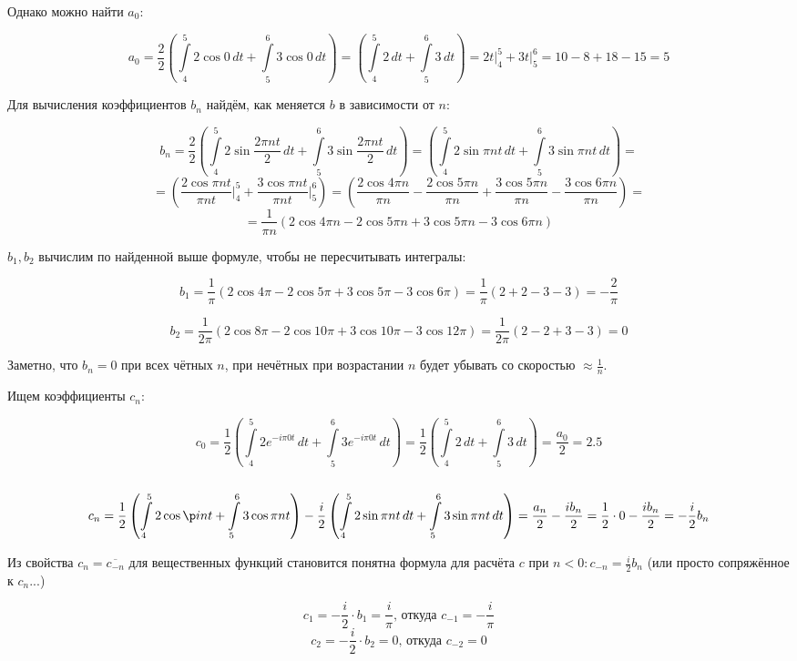 \documentclass[a4paper]{article}
\newcommand{\at}{\biggr\rvert}
\let\oldint\int
\def\int{\oldint\limits}
\begin{document}
Однако можно найти $a_0$:

$$
a_0 = \frac{2}{2}\left( \int_{4}^{5} 2 \cos{0}\,dt + \int_{5}^{6} 3\cos{0}\,dt \right) = \left(\int_{4}^{5} 2\,dt + \int_{5}^{6} 3\,dt\right) = 2t\at^5_4 + 3t\at^6_5 = 10 - 8 + 18 - 15 = 5
$$

Для вычисления коэффициентов $b_n$ найдём, как меняется $b$ в зависимости от $n$:

$$b_n = \frac{2}{2}\left( \int_{4}^{5} 2\sin\frac{2\pi n t}{2}\,dt + \int_{5}^{6} 3\sin\frac{2\pi n t}{2}\,dt\right) = \left( \int_{4}^{5} 2\sin{\pi nt}\,dt + \int_{5}^{6} 3\sin{\pi nt}\,dt\right) = $$
$$= \left( \frac{2\cos{\pi nt}}{\pi nt} \at^5_4 + \frac{3\cos{\pi nt}}{\pi nt}\at^6_5 \right) = \left( \frac{2\cos{4\pi n}}{\pi n} - \frac{2\cos{5\pi n}}{\pi n} + \frac{3\cos{5\pi n}}{\pi n} - \frac{3\cos{6\pi n}}{\pi n}\right)=$$
$$=\frac{1}{\pi n} \left( 2\cos{4\pi n} - 2\cos{5\pi n} + 3\cos{5\pi n} - 3\cos{6\pi n}\right)
$$

$b_1, b_2$ вычислим по найденной выше формуле, чтобы не пересчитывать интегралы:

$$
b_1 = \frac{1}{\pi} \left( 2\cos{4\pi} - 2\cos{5\pi} + 3\cos{5\pi} - 3\cos{6\pi}\right)=\frac{1}{\pi}\left( 2 + 2 - 3 -3 \right) = -\frac{2}{\pi}
$$

$$
b_2 = \frac{1}{2\pi} \left( 2\cos{8\pi} - 2\cos{10\pi} + 3\cos{10\pi} - 3\cos{12\pi}\right)=\frac{1}{2\pi}\left( 2 - 2 + 3 - 3 \right) = 0
$$

Заметно, что $b_n=0$ при всех чётных $n$, при нечётных при возрастании $n$ будет убывать со скоростью $\approx\frac{1}{n}$.

Ищем коэффициенты $c_n$:

$$c_0 = \frac{1}{2}\left( \int_{4}^{5} 2e^{-i\pi0t}\,dt + \int_{5}^{6} 3e^{-i\pi0t}\,dt \right) = \frac{1}{2}\left( \int_{4}^{5} 2\,dt + \int_{5}^{6} 3\,dt \right) = \frac{a_0}{2} = 2.5$$\
$$c_n = \frac{1}{2}\left( \int_{4}^{5}2\cos{\p int} + \int_{5}^{6} 3\cos{\pi nt} \right) - \frac{i}{2}\left( \int_{4}^{5} 2\sin{\pi nt}\,dt + \int_{5}^{6} 3\sin{\pi nt}\,dt \right) = \frac{a_n}{2} - \frac{ib_n}{2} = \frac{1}{2} \cdot 0 - \frac{ib_n}{2} = - \frac{i}{2} b_n$$

Из свойства $c_n=\overline{c_{-n}}$ для вещественных функций становится понятна формула для расчёта $c$ при $n < 0: c_{-n}=\frac{i}{2} b_n$ (или просто сопряжённое к $c_n$...)

$$
c_1 = - \frac{i}{2} \cdot b_1 = \frac{i}{\pi} \text{, откуда } c_{-1} = -\frac{i}{\pi}
$$
$$
c_{2} = - \frac{i}{2} \cdot b_2 = 0 \text{, откуда } c_{-2} = 0
$$
\end{document}
